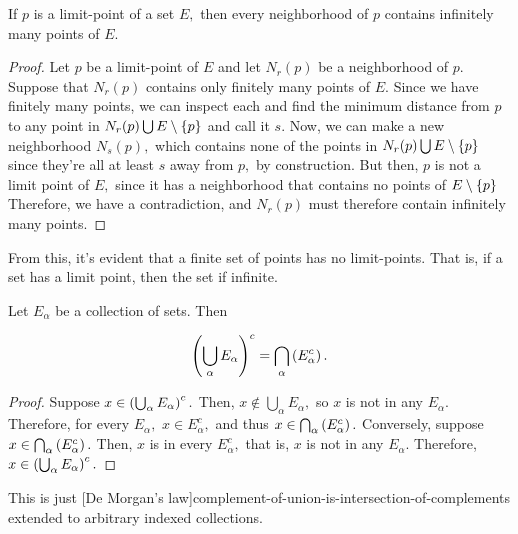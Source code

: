 \documentclass{article}
\begin{document}

\begin{theorem}\label{neighborhood-of-limit-point-contains-infinitely-many-points}
If $p$ is a \@{limit-point} of a set $E,$ then every \@{neighborhood} of $p$ contains infinitely many points of $E.$
\end{theorem}

\begin{proof}
Let $p$ be a \@{limit-point} of $E$ and let $N_r(p)$ be a \@{neighborhood} of $p.$ Suppose that $N_r(p)$ contains only finitely many points of $E.$ Since we have finitely many points, we can inspect each and find the minimum distance from $p$ to any point in $N_r(p) \bigcup E\setminus\left\{ p \right\}$ and call it $s.$ Now, we can make a new neighborhood $N_s(p),$ which contains none of the points in $N_r(p) \bigcup E\setminus\left\{ p \right\}$ since they're all at least $s$ away from $p,$ by construction. But then, $p$ is not a limit point of $E,$ since it has a neighborhood that contains no points of $E\setminus\left\{ p \right\}$ Therefore, we have a contradiction, and $N_r(p)$ must therefore contain infinitely many points.
\end{proof}

\begin{corollary}\label{only-infinite-sets-have-limit-points}
From this, it's evident that a \@{finite} set of points has no \@{limit-points}. That is, if a set has a limit point, then the set if \@{infinite}.
\end{corollary}

\begin{theorem}\label{complement-of-union-is-intersection-of-complements-general}
Let ${E_\alpha}$ be a \@{collection} of sets. Then

\[ \left(\bigcup_{\alpha} E_\alpha\right)^c = \bigcap_{\alpha} \left(E_{\alpha}^c\right). \]
\end{theorem}

\begin{proof}
Suppose $x \in \left(\bigcup_{\alpha} E_\alpha\right)^c.$ Then, $x \notin \bigcup_{\alpha} E_\alpha,$ so $x$ is not in any $E_\alpha.$ Therefore, for every $E_\alpha,$ $x \in E_\alpha^c,$ and thus $x \in \bigcap_{\alpha} \left(E_{\alpha}^c\right).$ Conversely, suppose $x \in \bigcap_{\alpha} \left(E_{\alpha}^c\right).$ Then, $x$ is in every $E_\alpha^c,$ that is, $x$ is not in any $E_\alpha.$ Therefore, $x \in \left(\bigcup_{\alpha} E_\alpha\right)^c.$
\end{proof}

\begin{note}
This is just \@[De Morgan's law]{complement-of-union-is-intersection-of-complements} extended to arbitrary indexed collections.
\end{note}
\end{document}

